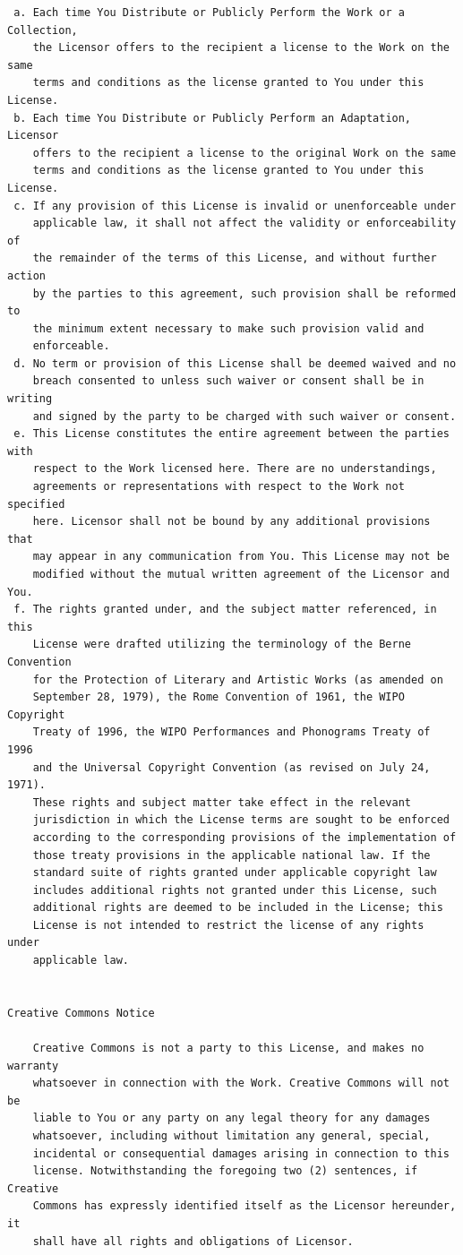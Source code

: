 \documentclass[10pt]{book}              %
\begin{document}
\begin{appendices}
\begin{verbatim}
 a. Each time You Distribute or Publicly Perform the Work or a Collection,
    the Licensor offers to the recipient a license to the Work on the same
    terms and conditions as the license granted to You under this License.
 b. Each time You Distribute or Publicly Perform an Adaptation, Licensor
    offers to the recipient a license to the original Work on the same
    terms and conditions as the license granted to You under this License.
 c. If any provision of this License is invalid or unenforceable under
    applicable law, it shall not affect the validity or enforceability of
    the remainder of the terms of this License, and without further action
    by the parties to this agreement, such provision shall be reformed to
    the minimum extent necessary to make such provision valid and
    enforceable.
 d. No term or provision of this License shall be deemed waived and no
    breach consented to unless such waiver or consent shall be in writing
    and signed by the party to be charged with such waiver or consent.
 e. This License constitutes the entire agreement between the parties with
    respect to the Work licensed here. There are no understandings,
    agreements or representations with respect to the Work not specified
    here. Licensor shall not be bound by any additional provisions that
    may appear in any communication from You. This License may not be
    modified without the mutual written agreement of the Licensor and You.
 f. The rights granted under, and the subject matter referenced, in this
    License were drafted utilizing the terminology of the Berne Convention
    for the Protection of Literary and Artistic Works (as amended on
    September 28, 1979), the Rome Convention of 1961, the WIPO Copyright
    Treaty of 1996, the WIPO Performances and Phonograms Treaty of 1996
    and the Universal Copyright Convention (as revised on July 24, 1971).
    These rights and subject matter take effect in the relevant
    jurisdiction in which the License terms are sought to be enforced
    according to the corresponding provisions of the implementation of
    those treaty provisions in the applicable national law. If the
    standard suite of rights granted under applicable copyright law
    includes additional rights not granted under this License, such
    additional rights are deemed to be included in the License; this
    License is not intended to restrict the license of any rights under
    applicable law.


Creative Commons Notice

    Creative Commons is not a party to this License, and makes no warranty
    whatsoever in connection with the Work. Creative Commons will not be
    liable to You or any party on any legal theory for any damages
    whatsoever, including without limitation any general, special,
    incidental or consequential damages arising in connection to this
    license. Notwithstanding the foregoing two (2) sentences, if Creative
    Commons has expressly identified itself as the Licensor hereunder, it
    shall have all rights and obligations of Licensor.


\end{verbatim}
\end{appendices}
\end{document}
